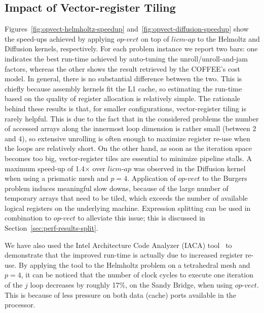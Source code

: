 \documentclass[conference]{IEEEtran}
\begin{document}
\subsection{Impact of Vector-register Tiling}
\label{sec:perf-eval-opvect}
Figures~\ref{fig:opvect-helmholtz-speedup} and~\ref{fig:opvect-diffusion-speedup} show the speed-ups achieved by applying $op$-$vect$ on top of $licm$-$ap$ to the Helmoltz and Diffusion kernels, respectively. For each problem instance we report two bars: one indicates the best run-time achieved by auto-tuning the unroll/unroll-and-jam factors, whereas the other shows the result retrieved by the COFFEE's cost model. In general, there is no substantial difference between the two. This is chiefly because assembly kernels fit the L1 cache, so estimating the run-time based on the quality of register allocation is relatively simple. The rationale behind these results is that, for smaller configurations, vector-register tiling is rarely helpful. This is due to the fact that in the considered problems the number of accessed arrays along the innermost loop dimension is rather small (between 2 and 4), so extensive unrolling is often enough to maximize register re-use when the loops are relatively short. On the other hand, as soon as the iteration space becomes too big, vector-register tiles are essential to minimize pipeline stalls. A maximum speed-up of 1.4$\times$ over $licm$-$ap$ was observed in the Diffusion kernel when using a prismatic mesh and $p=4$. Application of $op$-$vect$ to the Burgers problem induces meaningful slow downs, because of the large number of temporary arrays that need to be tiled, which exceeds the number of available logical registers on the underlying machine. Expression splitting can be used in combination to $op$-$vect$ to alleviate this issue; this is discussed in Section~\ref{sec:perf-results-split}.

We have also used the Intel Architecture Code Analyzer (IACA) tool~\cite{IACA} to demonstrate that the improved run-time is actually due to increased register re-use. By applying the tool to the Helmholtz problem on a tetrahedral mesh and $p=4$, it can be noticed that the number of clock cycles to execute one iteration of the $j$ loop decreases by roughly 17$\%$, on the Sandy Bridge, when using $op$-$vect$. This is because of less pressure on both data (cache) ports available in the processor. 
\end{document}
